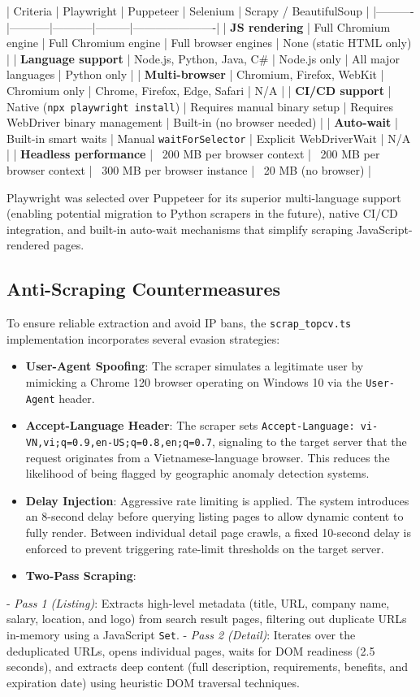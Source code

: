| Criteria | Playwright | Puppeteer | Selenium | Scrapy / BeautifulSoup |
|----------|-----------|-----------|---------|----------------------|
| \textbf{JS rendering} | Full Chromium engine | Full Chromium engine | Full browser engines | None (static HTML only) |
| \textbf{Language support} | Node.js, Python, Java, C\# | Node.js only | All major languages | Python only |
| \textbf{Multi-browser} | Chromium, Firefox, WebKit | Chromium only | Chrome, Firefox, Edge, Safari | N/A |
| \textbf{CI/CD support} | Native (\texttt{npx playwright install}) | Requires manual binary setup | Requires WebDriver binary management | Built-in (no browser needed) |
| \textbf{Auto-wait} | Built-in smart waits | Manual \texttt{waitForSelector} | Explicit WebDriverWait | N/A |
| \textbf{Headless performance} | ~200 MB per browser context | ~200 MB per browser context | ~300 MB per browser instance | ~20 MB (no browser) |

Playwright was selected over Puppeteer for its superior multi-language support (enabling potential migration to Python scrapers in the future), native CI/CD integration, and built-in auto-wait mechanisms that simplify scraping JavaScript-rendered pages.

\subsection{Anti-Scraping Countermeasures}
To ensure reliable extraction and avoid IP bans, the \texttt{scrap\_topcv.ts} implementation incorporates several evasion strategies:
\begin{itemize}
\item \textbf{User-Agent Spoofing}: The scraper simulates a legitimate user by mimicking a Chrome 120 browser operating on Windows 10 via the \texttt{User-Agent} header.
\item \textbf{Accept-Language Header}: The scraper sets \texttt{Accept-Language: vi-VN,vi;q=0.9,en-US;q=0.8,en;q=0.7}, signaling to the target server that the request originates from a Vietnamese-language browser. This reduces the likelihood of being flagged by geographic anomaly detection systems.
\item \textbf{Delay Injection}: Aggressive rate limiting is applied. The system introduces an 8-second delay before querying listing pages to allow dynamic content to fully render. Between individual detail page crawls, a fixed 10-second delay is enforced to prevent triggering rate-limit thresholds on the target server.
\item \textbf{Two-Pass Scraping}:
\end{itemize}
  - \textit{Pass 1 (Listing)}: Extracts high-level metadata (title, URL, company name, salary, location, and logo) from search result pages, filtering out duplicate URLs in-memory using a JavaScript \texttt{Set}.
  - \textit{Pass 2 (Detail)}: Iterates over the deduplicated URLs, opens individual pages, waits for DOM readiness (2.5 seconds), and extracts deep content (full description, requirements, benefits, and expiration date) using heuristic DOM traversal techniques.

